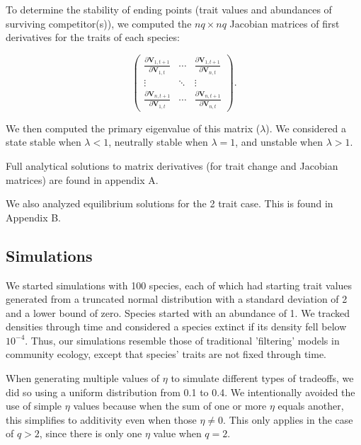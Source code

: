 To determine the stability of ending points (trait values and abundances of
surviving competitor(s)), we computed the $nq \times nq$ Jacobian matrices
of first derivatives for the traits of each species:

\begin{equation} \label{eq:jacobian}
    \begin{pmatrix}
        \frac{\partial \mathbf{V}_{1,t+1}}{\partial \mathbf{V}_{1,t}} & \cdots &
            \frac{\partial \mathbf{V}_{1,t+1}}{\partial \mathbf{V}_{n,t}} \\
        \vdots & \ddots & \vdots \\
        \frac{\partial \mathbf{V}_{n,t+1}}{\partial \mathbf{V}_{1,t}} & \cdots &
            \frac{\partial \mathbf{V}_{n,t+1}}{\partial \mathbf{V}_{n,t}}
    \end{pmatrix}
    \textrm{.}
\end{equation}

\noindent We then computed the primary eigenvalue of this matrix ($\lambda$).
We considered a state stable when $\lambda < 1$,
neutrally stable when $\lambda = 1$,
and unstable when $\lambda > 1$.

Full analytical solutions to matrix derivatives (for trait change and
Jacobian matrices) are found in appendix A.

We also analyzed equilibrium solutions for the 2 trait case.
This is found in Appendix B.





\subsection*{Simulations}

We started simulations with 100 species, each of which
had starting trait values generated from a truncated normal distribution 
with a standard deviation of 2 and a lower bound of zero.
Species started with an abundance of 1.
We tracked densities through time and considered a species extinct if its 
density fell below $10^{-4}$.
Thus, our simulations resemble those of traditional 'filtering' models
in community ecology, 
except that species' traits are not fixed through time.

When generating multiple values of $\eta$ to simulate different 
types of tradeoffs, 
we did so using a uniform distribution from 0.1 to 0.4.
We intentionally avoided the use of simple $\eta$ values because
when the sum of one or more $\eta$ equals another, this simplifies
to additivity even when those $\eta \ne 0$.
This only applies in the case of $q > 2$, since there is only one
$\eta$ value when $q = 2$.






